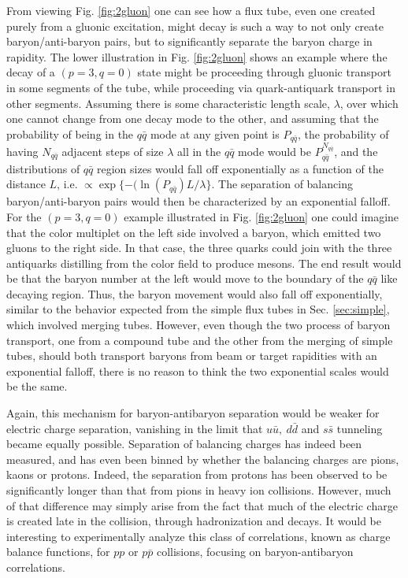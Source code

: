 \documentclass[aps, prc, 12pt, nofootinbib, showpacs, superscriptaddress, tightenlines, groupedaddress]{revtex4-2}
\begin{document}
From viewing Fig. \ref{fig:2gluon} one can see how a flux tube, even one created purely from a gluonic excitation, might decay is such a way to not only create baryon/anti-baryon pairs, but to significantly separate the baryon charge in rapidity. The lower illustration in Fig. \ref{fig:2gluon} shows an example where the decay of a $(p=3,q=0)$ state might be proceeding through gluonic transport in some segments of the tube, while proceeding via quark-antiquark transport in other segments. Assuming there is some characteristic length scale, $\lambda$, over which one cannot change from one decay mode to the other, and assuming that the probability of being in the $q\bar{q}$ mode at any given point is $P_{q\bar{q}}$, the probability of having $N_{q\bar{q}}$  adjacent steps of size $\lambda$ all in the $q\bar{q}$ mode would be $P_{q\bar{q}}^{N_{q\bar{q}}}$, and the distributions of $q\bar{q}$ region sizes would fall off exponentially as a function of the distance $L$, i.e. $\propto \exp\{-(\ln(P_{q\bar{q}})L/\lambda\}$. The separation of balancing baryon/anti-baryon pairs would then be characterized by an exponential falloff. For the $(p=3,q=0)$ example illustrated in Fig. \ref{fig:2gluon} one could imagine that the color multiplet on the left side involved a baryon, which emitted two gluons to the right side. In that case, the three quarks could join with the three antiquarks distilling from the color field to produce mesons. The end result would be that the baryon number at the left would move to the boundary of the $q\bar{q}$ like decaying region. Thus, the baryon movement would also fall off exponentially, similar to the behavior expected from the simple flux tubes in Sec. \ref{sec:simple}, which involved merging tubes. However, even though the two process of baryon transport, one from a compound tube and the other from the merging of simple tubes, should both transport baryons from beam or target rapidities with an exponential falloff, there is no reason to think the two exponential scales would be the same.

Again, this mechanism for baryon-antibaryon separation would be  weaker for electric charge separation, vanishing in the limit that $u\bar{u},~d\bar{d}$ and $s\bar{s}$ tunneling became equally possible. Separation of balancing charges has indeed been measured, and has even been binned by whether the balancing charges are pions, kaons or protons. Indeed, the separation from protons has been observed to be significantly longer than that from pions in heavy ion collisions. However, much of that difference may simply arise from the fact that much of the electric charge is created late in the collision, through hadronization and decays. It would be interesting to experimentally analyze this class of correlations, known as charge balance functions, for $pp$ or $p\bar{p}$ collisions, focusing on baryon-antibaryon correlations.
\end{document}
